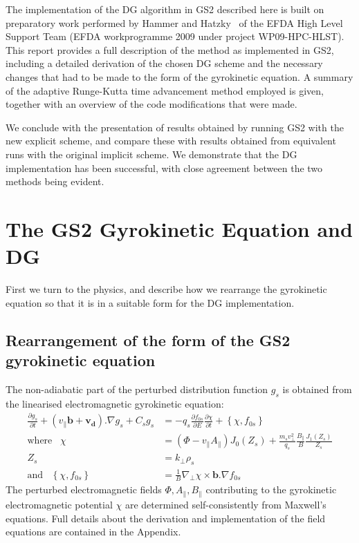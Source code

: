 \documentclass[10pt,a4paper]{article}
\newcommand{\dd}{\partial}
\begin{document}
The implementation of the DG algorithm in GS2 described here is built on
preparatory work performed by Hammer and Hatzky~\cite{hammer} of the EFDA High
Level Support Team (EFDA workprogramme 2009 under project WP09-HPC-HLST). This
report provides a full description of the method as implemented in GS2,
including a detailed derivation of the chosen DG scheme and the necessary
changes that had to be made to the form of the gyrokinetic equation. A summary
of the adaptive Runge-Kutta time advancement method employed is given,
together with an overview of the code modifications that were made.

We conclude with the presentation of results obtained by running GS2 with the
new explicit scheme, and compare these with results obtained from equivalent
runs with the original implicit scheme. We demonstrate that the DG
implementation has been successful, with close agreement between the two
methods being evident.

\section{The GS2 Gyrokinetic Equation and DG}
\label{sec:gkeqn_rearrangment}

First we turn to the physics, and describe how we rearrange the gyrokinetic
equation so that it is in a suitable form for the DG implementation.

\subsection{Rearrangement of the form of the GS2 gyrokinetic equation}

The non-adiabatic part of the perturbed distribution function $g_s$ is obtained
from the linearised electromagnetic gyrokinetic equation:
\begin{align}
  \frac{\dd g_s}{\dd t} + (v_\parallel \mathbf{b} + \mathbf{v_d}).\nabla g_s +
  C_s g_s & = -q_s \frac{\dd f_{0s}}{\dd E} \frac{\dd \chi}{\dd t} + 
  \left\{ \chi, f_{0s}\right\} \label{eqn:g}\\
  \mbox{where} \;\;\; \chi & = \left(\Phi - v_\parallel A_\parallel \right)
  J_0(Z_s) + \frac{m_s v_\perp^2}{q_s} \frac{B_\parallel}{B}
  \frac{J_1(Z_s)}{Z_s} \label{eqn:chi} \\
  Z_s & = k_\perp \rho_s \nonumber \\
  \mbox{and} \;\;\; \left\{ \chi, f_{0s}\right\} & = \frac{1}{B} \nabla_\perp
  \chi \times \mathbf{b}.\nabla f_{0s}
\end{align}
The perturbed electromagnetic fields $\Phi, A_\parallel, B_\parallel$
contributing to the gyrokinetic electromagnetic potential $\chi$ are
determined self-consistently from Maxwell's equations. Full details about the
derivation and implementation of the field equations are contained in the
Appendix.
\end{document}
